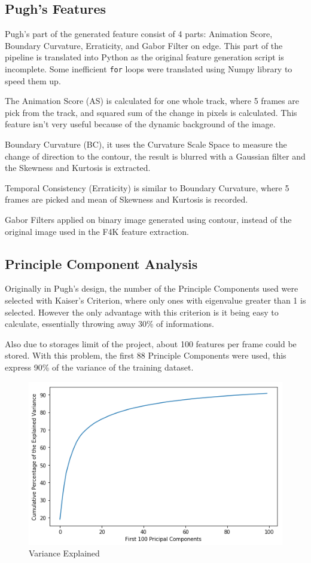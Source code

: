 \documentclass[bsc,logo,twoside,fullspacing,parskip]{infthesis}
\begin{document}
\subsection{Pugh's Features}

Pugh's part of the generated feature consist of 4 parts: Animation Score, Boundary Curvature, Erraticity, and Gabor Filter on edge. This part of the pipeline is translated into Python as the original feature generation script is incomplete. Some inefficient {\tt for} loops were translated using Numpy library to speed them up.

The Animation Score (AS) is calculated for one whole track, where 5 frames are pick from the track, and squared sum of the change in pixels is calculated. This feature isn't very useful because of the dynamic background of the image.

Boundary Curvature (BC), it uses the Curvature Scale Space to measure the change of direction to the contour, the result is blurred with a Gaussian filter and the Skewness and Kurtosis is extracted. 

Temporal Consistency (Erraticity) is similar to Boundary Curvature, where 5 frames are picked and mean of Skewness and Kurtosis is recorded.

Gabor Filters applied on binary image generated using contour, instead of the original image used in the F4K feature extraction. 

\subsection{Principle Component Analysis}

Originally in Pugh's design, the number of the Principle Components used were selected with Kaiser's Criterion, where only ones with eigenvalue greater than 1 is selected. However the only advantage with this criterion is it being easy to calculate, essentially throwing away 30\% of informations.

Also due to storages limit of the project, about 100 features per frame could be stored. With this problem, the first 88 Principle Components were used, this express 90\% of the variance of the training dataset.

\begin{figure}[ht]
\centering
    \includegraphics[scale=0.40]{graph/pcas.png}
    \caption{Variance Explained}
    \label{fig:pcsused}
\end{figure}
\end{document}
